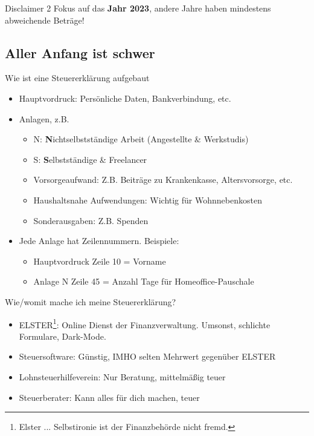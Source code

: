 \documentclass{beamer}
\begin{document}
		\begin{frame}{Disclaimer 2}
			Fokus auf das \textbf{Jahr 2023}, andere Jahre haben mindestens abweichende Beträge!
		\end{frame}
	
		\subsection{Aller Anfang ist schwer}

			\begin{frame}{Wie ist eine Steuererklärung aufgebaut}
				\begin{itemize}
					\item Hauptvordruck: Persönliche Daten, Bankverbindung, etc.
					\item Anlagen, z.B.
					\begin{itemize}
						\item N: \textbf{N}ichtselbstständige Arbeit (Angestellte \& Werkstudis)
						\item S: \textbf{S}elbstständige \& Freelancer
						\item Vorsorgeaufwand: Z.B. Beiträge zu Krankenkasse, Altersvorsorge, etc.
						\item Haushaltsnahe Aufwendungen: Wichtig für Wohnnebenkosten
						\item Sonderausgaben: Z.B. Spenden
					\end{itemize}
					\item Jede Anlage hat Zeilennummern. Beispiele:
					\begin{itemize}
						\item Hauptvordruck Zeile 10 = Vorname
						\item Anlage N Zeile 45 = Anzahl Tage für Homeoffice-Pauschale
					\end{itemize}
				\end{itemize}
			\end{frame}

			\begin{frame}{Wie/womit mache ich meine Steuererklärung?}
				\begin{itemize}
					\item ELSTER\footnote{Elster ... Selbstironie ist der Finanzbehörde nicht fremd.}: Online Dienst der Finanzverwaltung. Umsonst, schlichte Formulare, Dark-Mode.
					\item Steuersoftware: Günstig, IMHO selten Mehrwert gegenüber ELSTER
					\item Lohnsteuerhilfeverein: Nur Beratung, mittelmäßig teuer
					\item Steuerberater: Kann alles für dich machen, teuer
				\end{itemize}
			\end{frame}
		
\end{document}
